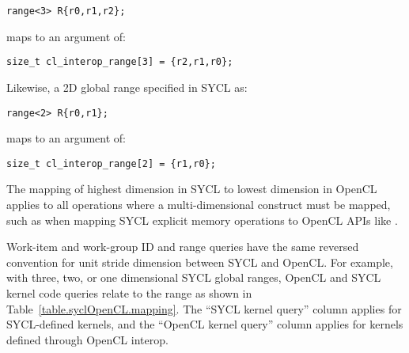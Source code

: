\begin{lstlisting}[style=nonumbers]
range<3> R{r0,r1,r2};
\end{lstlisting}

maps to an   argument
of:

\begin{lstlisting}[style=nonumbers]
size_t cl_interop_range[3] = {r2,r1,r0};
\end{lstlisting}

Likewise, a 2D global range specified in SYCL as:

\begin{lstlisting}[style=nonumbers]
range<2> R{r0,r1};
\end{lstlisting}

maps to an   argument
of:

\begin{lstlisting}[style=nonumbers]
size_t cl_interop_range[2] = {r1,r0};
\end{lstlisting}

The mapping of highest dimension in SYCL to lowest dimension in OpenCL applies to all
operations where a multi-dimensional construct must be mapped, such as when mapping SYCL
explicit memory operations to OpenCL APIs like .

Work-item and work-group ID and range queries have the same reversed convention for unit
stride dimension between SYCL and OpenCL.  For example, with three, two, or one dimensional SYCL
global ranges, OpenCL and SYCL kernel code queries relate to the range as shown in Table~\ref{table.syclOpenCL.mapping}.
The ``SYCL kernel query'' column applies for SYCL-defined kernels, and the ``OpenCL kernel query'' column
applies for kernels defined through OpenCL interop.

